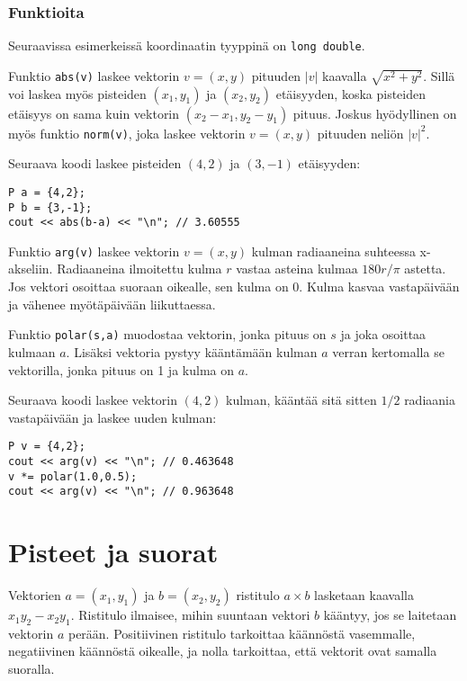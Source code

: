 \subsubsection*{Funktioita}

Seuraavissa esimerkeissä koordinaatin tyyppinä on
\texttt{long double}.

Funktio \texttt{abs(v)} laskee vektorin $v=(x,y)$
pituuden $|v|$ kaavalla $\sqrt{x^2+y^2}$.
Sillä voi laskea myös pisteiden $(x_1,y_1)$
ja $(x_2,y_2)$ etäisyyden,
koska pisteiden etäisyys
on sama kuin vektorin $(x_2-x_1,y_2-y_1)$ pituus.
Joskus hyödyllinen on myös funktio \texttt{norm(v)},
joka laskee vektorin $v=(x,y)$ pituuden neliön $|v|^2$.

Seuraava koodi laskee
pisteiden $(4,2)$ ja $(3,-1)$ etäisyyden:
\begin{lstlisting}
P a = {4,2};
P b = {3,-1};
cout << abs(b-a) << "\n"; // 3.60555
\end{lstlisting}

Funktio \texttt{arg(v)} laskee vektorin $v=(x,y)$
kulman radiaaneina suhteessa x-akseliin.
Radiaaneina ilmoitettu kulma $r$ vastaa asteina
kulmaa $180  r/\pi$ astetta.
Jos vektori osoittaa suoraan oikealle,
sen kulma on 0.
Kulma kasvaa vastapäivään ja vähenee myötäpäivään
liikuttaessa.

Funktio \texttt{polar(s,a)} muodostaa vektorin,
jonka pituus on $s$ ja joka osoittaa kulmaan $a$.
Lisäksi vektoria pystyy kääntämään kulman $a$
verran kertomalla se vektorilla,
jonka pituus on 1 ja kulma on $a$.

Seuraava koodi laskee vektorin $(4,2)$ kulman,
kääntää sitä sitten $1/2$ radiaania vastapäivään
ja laskee uuden kulman:

\begin{lstlisting}
P v = {4,2};
cout << arg(v) << "\n"; // 0.463648
v *= polar(1.0,0.5);
cout << arg(v) << "\n"; // 0.963648
\end{lstlisting}

\section{Pisteet ja suorat}

Vektorien
$a=(x_1,y_1)$ ja $b=(x_2,y_2)$ ristitulo $a \times b$
lasketaan kaavalla $x_1 y_2 - x_2 y_1$.
Ristitulo ilmaisee, mihin suuntaan vektori $b$
kääntyy, jos se laitetaan vektorin $a$ perään.
Positiivinen ristitulo tarkoittaa käännöstä vasemmalle,
negatiivinen käännöstä oikealle, ja nolla tarkoittaa,
että vektorit ovat samalla suoralla.

